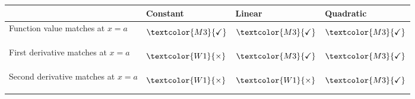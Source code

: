 \begin{frame}
\abovedisplayskip=0pt
\belowdisplayskip=0pt
\begin{tabular}{p{}*{3}{|p{.2\textwidth}}}
 &Constant & Linear  & Quadratic \\
\hline
\raggedright Function value matches at $x=a$& \[\textcolor{M3}{\checkmark}\] & \[\textcolor{M3}{\checkmark}\]& \[\textcolor{M3}{\checkmark}\]\\\hline
\raggedright First derivative matches at $x=a$& \[\textcolor{W1}{\times}\] & \[\textcolor{M3}{\checkmark}\]&  \[\textcolor{M3}{\checkmark}\]
\\\hline
\raggedright Second derivative matches at $x=a$& \[\textcolor{W1}{\times}\] & \[\textcolor{W1}{\times}\] & \[\textcolor{M3}{\checkmark}\]
\end{tabular}
\end{frame}

